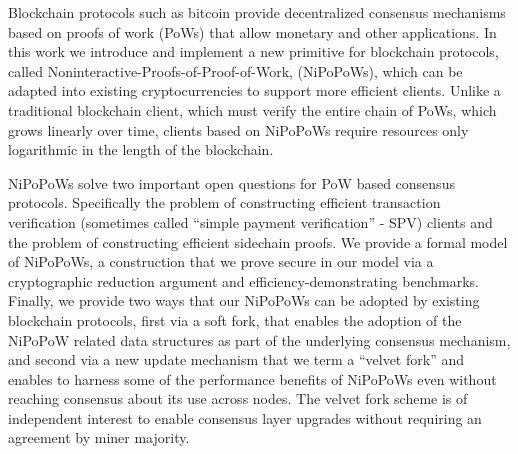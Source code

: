 Blockchain protocols such as bitcoin provide decentralized consensus
mechanisms based on proofs of work (PoWs) 
that allow monetary and other applications. 
%
In this work we introduce and implement a new primitive for blockchain protocols, called Noninteractive-Proofs-of-Proof-of-Work, (NiPoPoWs), which can be adapted into existing cryptocurrencies to support more efficient clients.
Unlike a traditional blockchain client, which must verify the entire chain of PoWs, which grows linearly over time, clients based on NiPoPoWs require resources only logarithmic in the length of the blockchain.

NiPoPoWs solve two important open questions for PoW based consensus
protocols. Specifically the problem  
of constructing efficient transaction verification (sometimes called
``simple payment verification'' - SPV) clients and 
the problem of constructing efficient sidechain proofs. 
%
%
We provide a formal model of NiPoPoWs, a construction that we prove
secure in our model 
via a cryptographic reduction argument and 
efficiency-demonstrating benchmarks.
Finally, we provide two ways that our NiPoPoWs can be adopted by
 existing blockchain protocols, first via a soft fork, that enables the 
   adoption of the NiPoPoW related data structures
  as part of the underlying consensus mechanism, 
 and second  via a new update mechanism 
that we term a ``velvet fork'' and enables to harness some of
the performance benefits of NiPoPoWs even without reaching consensus about its use
across nodes. The velvet fork scheme is of independent interest to enable
consensus layer upgrades without requiring an agreement by miner majority.


